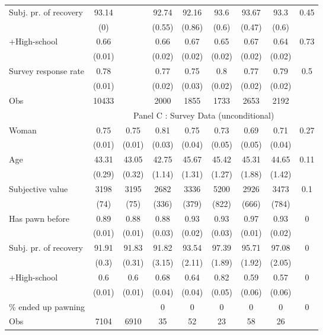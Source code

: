 \begin{tabular}{lcccccccc}
Subj. pr. of recovery & 93.14 &       & 92.74 & 92.16 & 93.6  & 93.67 & 93.3  & 0.45 \\
      & (0)   &       & (0.55) & (0.86) & (0.6) & (0.47) & (0.6) &  \\
+High-school & 0.66  &       & 0.66  & 0.67  & 0.65  & 0.67  & 0.64  & 0.73 \\
      & (0.01) &       & (0.02) & (0.02) & (0.02) & (0.02) & (0.02) &  \\
Survey response rate & 0.78  &       & 0.77  & 0.75  & 0.8   & 0.77  & 0.79  & 0.5 \\
      & (0.01) &       & (0.02) & (0.03) & (0.02) & (0.02) & (0.02) &  \\
\midrule
Obs   & 10433 &       & 2000  & 1855  & 1733  & 2653  & 2192  &  \\
\midrule
\midrule
      & \multicolumn{8}{c}{Panel C : Survey Data (unconditional)} \\
\midrule
\midrule
Woman & 0.75  & 0.75  & 0.81  & 0.75  & 0.73  & 0.69  & 0.71  & 0.27 \\
      & (0.01) & (0.01) & (0.03) & (0.04) & (0.05) & (0.05) & (0.04) &  \\
Age   & 43.31 & 43.05 & 42.75 & 45.67 & 45.42 & 45.31 & 44.65 & 0.11 \\
      & (0.29) & (0.32) & (1.14) & (1.31) & (1.27) & (1.88) & (1.42) &  \\
Subjective value & 3198  & 3195  & 2682  & 3336  & 5200  & 2926  & 3473  & 0.1 \\
      & (74)  & (75)  & (336) & (379) & (822) & (666) & (784) &  \\
Has pawn before & 0.89  & 0.88  & 0.88  & 0.93  & 0.93  & 0.97  & 0.93  & 0 \\
      & (0.01) & (0.01) & (0.03) & (0.02) & (0.03) & (0.01) & (0.02) &  \\
Subj. pr. of recovery & 91.91 & 91.83 & 91.82 & 93.54 & 97.39 & 95.71 & 97.08 & 0 \\
      & (0.3) & (0.31) & (3.15) & (2.11) & (1.89) & (1.92) & (2.05) &  \\
+High-school & 0.6   & 0.6   & 0.68  & 0.64  & 0.82  & 0.59  & 0.57  & 0 \\
      & (0.01) & (0.01) & (0.04) & (0.04) & (0.05) & (0.06) & (0.06) &  \\
\% ended up pawning &       &       & 0     & 0     & 0     & 0     & 0     & 0 \\
\midrule
Obs   & 7104  & 6910  & 35    & 52    & 23    & 58    & 26    &  \\
\bottomrule
\bottomrule
\end{tabular}%
